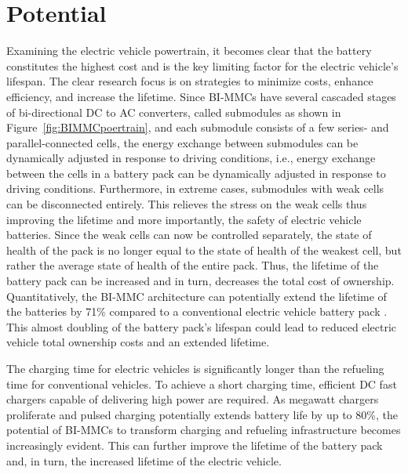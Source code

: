 \documentclass{article}
\begin{document}
\section{Potential}
Examining the electric vehicle powertrain, it becomes clear that the battery constitutes the highest cost and is the key limiting factor for the electric vehicle's lifespan.
The clear research focus is on strategies to minimize costs, enhance efficiency, and increase the lifetime.
Since BI-MMCs have several cascaded stages of bi-directional DC to AC converters, called submodules as shown in Figure~\ref{fig:BIMMCpoertrain}, and each submodule consists of a few series- and parallel-connected cells, the energy exchange between submodules can be dynamically adjusted in response to driving conditions, i.e., energy exchange between the cells in a battery pack can be dynamically adjusted in response to driving conditions. Furthermore, in extreme cases, submodules with weak cells can be disconnected entirely. This relieves the stress on the weak cells thus improving the lifetime and more importantly, the safety of electric vehicle batteries. Since the weak cells can now be controlled separately, the state of health of the pack is no longer equal to the state of health of the weakest cell, but rather the average state of health of the entire pack. Thus, the lifetime of the battery pack can be increased and in turn, decreases the total cost of ownership. Quantitatively, the BI-MMC architecture can potentially extend the lifetime of the batteries by 71\% compared to a conventional electric vehicle battery pack \cite{skegro2023analysis}. This almost doubling of the battery pack's lifespan could lead to reduced electric vehicle total ownership costs and an extended lifetime.

The charging time for electric vehicles is significantly longer than the refueling time for conventional vehicles. To achieve a short charging time, efficient DC fast chargers capable of delivering high power are required. As megawatt chargers proliferate and pulsed charging potentially extends battery life by up to 80\%, the potential of BI-MMCs to transform charging and refueling infrastructure becomes increasingly evident. This can further improve the lifetime of the battery pack and, in turn, the increased lifetime of the electric vehicle.
\end{document}
